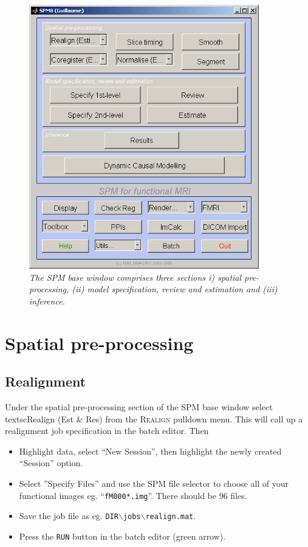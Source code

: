 \begin{figure}
\begin{center}
\includegraphics[width=100mm]{auditory/command}
\caption{\em The SPM base window comprises three sections i) spatial pre-processing, (ii) model specification, review and estimation and (iii) inference. \label{aud_command}}
\end{center}
\end{figure}

\section{Spatial pre-processing}

\subsection{Realignment}

Under the spatial pre-processing section of the SPM base window select textsc{Realign (Est \& Res)} from the \textsc{Realign} pulldown menu. This will call up a realignment job specification in the batch editor. Then
\begin{itemize}
\item Highlight data, select ``New Session'', then highlight the newly created ``Session'' option.
\item Select ''Specify Files'' and use the SPM file selector to choose all of your functional images eg. ``\texttt{fM000*.img}''. There should be 96 files.
\item Save the job file as eg. \texttt{DIR$\backslash$jobs$\backslash$realign.mat}.
\item Press the \texttt{RUN} button in the batch editor (green arrow).
\end{itemize}

